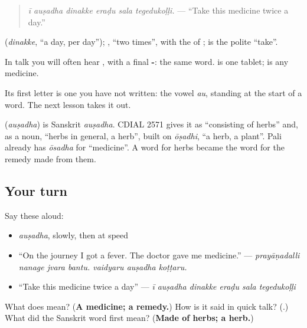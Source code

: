 \begin{quote}
\emph{ī auṣadha dinakke eraḍu sala tegedukoḷḷi.} — \textquotedblleft{}Take this medicine twice a day.\textquotedblright{}
\end{quote}

\textbf{} (\emph{dinakke}, \textquotedblleft{}a day, per day\textquotedblright{}); \textbf{ }, \textquotedblleft{}two times\textquotedblright{}, with the \textbf{} of \textbf{  }; \textbf{} is the polite \textquotedblleft{}take\textquotedblright{}.

In talk you will often hear \textbf{}, with a final \textbf{-}: the same word. \textbf{} is one tablet; \textbf{} is any medicine.

Its first letter is one you have not written: the vowel \emph{au}, standing at the start of a word. The next lesson takes it out.

\begin{cousinweb}
\textbf{} (\emph{auṣadha}) is Sanskrit \emph{auṣadha}. CDIAL 2571 gives it as \textquotedblleft{}consisting of herbs\textquotedblright{} and, as a noun, \textquotedblleft{}herbs in general, a herb\textquotedblright{}, built on \emph{ōṣadhi}, \textquotedblleft{}a herb, a plant\textquotedblright{}. Pali already has \emph{ōsadha} for \textquotedblleft{}medicine\textquotedblright{}. A word for herbs became the word for the remedy made from them.
\end{cousinweb}

\subsection*{Your turn}
Say these aloud:

\begin{itemize}
\raggedright
  \item \emph{auṣadha}, slowly, then at speed
  \item \textquotedblleft{}On the journey I got a fever. The doctor gave me medicine.\textquotedblright{} — \emph{prayāṇadalli nanage jvara bantu. vaidyaru auṣadha koṭṭaru.}
  \item \textquotedblleft{}Take this medicine twice a day\textquotedblright{} — \emph{ī auṣadha dinakke eraḍu sala tegedukoḷḷi}
\end{itemize}

\begin{tcolorbox}[breakable,colback=teal!4,colframe=teal!35!black,title={Before you move on}]
What does \textbf{} mean? (\textbf{A medicine; a remedy.}) How is it said in quick talk? (\textbf{}.) What did the Sanskrit word first mean? (\textbf{Made of herbs; a herb.})
\end{tcolorbox}
